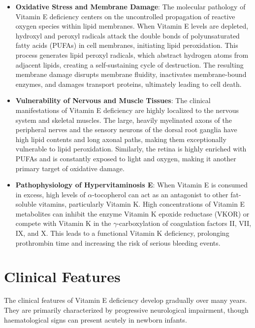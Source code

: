\begin{itemize}
    \item \textbf{Oxidative Stress and Membrane Damage}: The molecular pathology of Vitamin E deficiency centers on the uncontrolled propagation of reactive oxygen species within lipid membranes. When Vitamin E levels are depleted, hydroxyl and peroxyl radicals attack the double bonds of polyunsaturated fatty acids (PUFAs) in cell membranes, initiating lipid peroxidation. This process generates lipid peroxyl radicals, which abstract hydrogen atoms from adjacent lipids, creating a self-sustaining cycle of destruction. The resulting membrane damage disrupts membrane fluidity, inactivates membrane-bound enzymes, and damages transport proteins, ultimately leading to cell death.
    \item \textbf{Vulnerability of Nervous and Muscle Tissues}: The clinical manifestations of Vitamin E deficiency are highly localized to the nervous system and skeletal muscles. The large, heavily myelinated axons of the peripheral nerves and the sensory neurons of the dorsal root ganglia have high lipid contents and long axonal paths, making them exceptionally vulnerable to lipid peroxidation. Similarly, the retina is highly enriched with PUFAs and is constantly exposed to light and oxygen, making it another primary target of oxidative damage.

    \item \textbf{Pathophysiology of Hypervitaminosis E}: When Vitamin E is consumed in excess, high levels of $\alpha$-tocopherol can act as an antagonist to other fat-soluble vitamins, particularly Vitamin K. High concentrations of Vitamin E metabolites can inhibit the enzyme Vitamin K epoxide reductase (VKOR) or compete with Vitamin K in the $\gamma$-carboxylation of coagulation factors II, VII, IX, and X. This leads to a functional Vitamin K deficiency, prolonging prothrombin time and increasing the risk of serious bleeding events.
\end{itemize}

\section*{Clinical Features}
The clinical features of Vitamin E deficiency develop gradually over many years. They are primarily characterized by progressive neurological impairment, though haematological signs can present acutely in newborn infants.

